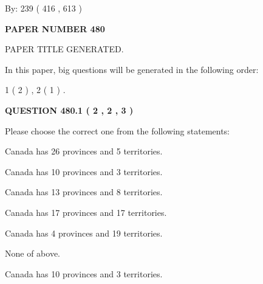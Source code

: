 \documentclass[12pt]{article}
\begin{document}
   
\hspace{1.0in} By: 
 239 ( 416 ,  613 )
   
   
   
   
\newpage 
\setcounter{page}{ 
   480001 } 
   
   
   
   
 {\textbf{ \Large{ PAPER NUMBER  480  }}}
   
   
\vspace{0.2in}
   
   
   
   
   
   
   
   
 \vspace{0.2in}
 
 
 
 
   
   
 PAPER TITLE GENERATED.
   
   
   
\vspace{0.2in}
   
In this paper, big questions will be generated in the following order: 
   
   
   1 ( 2 )
 ,
   2 ( 1 )
 .
  
\vspace{0.2in}
  
{\textbf{\Large{QUESTION
480.1 
 ( 2 , 2 , 3 )
}}}
  
  
Please choose the correct one from the following statements:
 
 
Canada has  26 provinces and  5 territories.
 
 
Canada has 10  provinces and 3 territories.
 
 
Canada has  13 provinces and  8 territories.
 
 
Canada has  17 provinces and  17 territories.
 
 
Canada has   4 provinces and  19 territories.
 
 
 None of above.
 
 
\noindent{}
 
 
Canada has 10  provinces and 3 territories.
 
\end{document}

